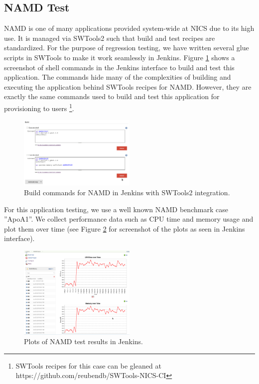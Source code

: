 \documentclass[10pt, conference, compsocconf]{IEEEtran}
\begin{document}
\subsection{NAMD Test}
NAMD is one of many applications provided system-wide at NICS due to its high use. It is managed via SWTools2 \cite{SWTools2} such that build and test recipes are standardized. For the purpose of regression testing, we have written several glue scripts in SWTools to make it work seamlessly in Jenkins. Figure \ref{fig:NAMD-jenkins} shows a screenshot of shell commands in the Jenkins interface to build and test this application. The commands hide many of the complexities of building and executing the application behind SWTools recipes for NAMD. However, they are exactly the same commands used to build and test this application for provisioning to users \footnote{SWTools recipes for this case can be gleaned at  https://github.com/reubendb/SWTools-NICS-CI}.

\begin{figure}[H]
\centering
\includegraphics[width=0.5\textwidth]{NAMD-Jenkins}
\caption{Build commands for NAMD in Jenkins with SWTools2 integration.}
\label{fig:NAMD-jenkins}
\end{figure}

For this application testing, we use a well known NAMD benchmark case ''ApoA1''. We collect performance data such as CPU time and memory usage and plot them over time (see Figure \ref{fig:NAMDPlot} for screenshot of the plots as seen in Jenkins interface). 

\begin{figure}[H]
\centering
\includegraphics[width=0.5\textwidth]{NAMDPlot}
\caption{Plots of NAMD test results in Jenkins.}
\label{fig:NAMDPlot}
\end{figure}
\end{document}
